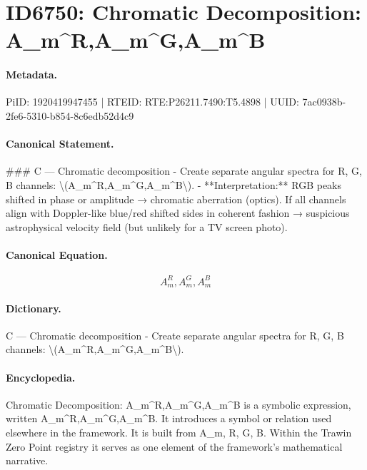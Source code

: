 \section*{ID6750: Chromatic Decomposition: A\_m\textasciicircum{}R,A\_m\textasciicircum{}G,A\_m\textasciicircum{}B}
\paragraph{Metadata.}
PiID: 1920419947455 | RTEID: RTE:P26211.7490:T5.4898 | UUID: 7ac0938b-2fe6-5310-b854-8c6edb52d4c9

\paragraph{Canonical Statement.}
\#\#\# C — Chromatic decomposition - Create separate angular spectra for R, G, B channels: \textbackslash{}(A\_m\textasciicircum{}R,A\_m\textasciicircum{}G,A\_m\textasciicircum{}B\textbackslash{}). - **Interpretation:** RGB peaks shifted in phase or amplitude → chromatic aberration (optics). If all channels align with Doppler-like blue/red shifted sides in coherent fashion → suspicious astrophysical velocity field (but unlikely for a TV screen photo).

\paragraph{Canonical Equation.}
\[
A_m^R,A_m^G,A_m^B
\]

\paragraph{Dictionary.}
C — Chromatic decomposition - Create separate angular spectra for R, G, B channels: \textbackslash{}(A\_m\textasciicircum{}R,A\_m\textasciicircum{}G,A\_m\textasciicircum{}B\textbackslash{}).

\paragraph{Encyclopedia.}
Chromatic Decomposition: A\_m\textasciicircum{}R,A\_m\textasciicircum{}G,A\_m\textasciicircum{}B is a symbolic expression, written A\_m\textasciicircum{}R,A\_m\textasciicircum{}G,A\_m\textasciicircum{}B. It introduces a symbol or relation used elsewhere in the framework. It is built from A\_m, R, G, B. Within the Trawin Zero Point registry it serves as one element of the framework's mathematical narrative.
